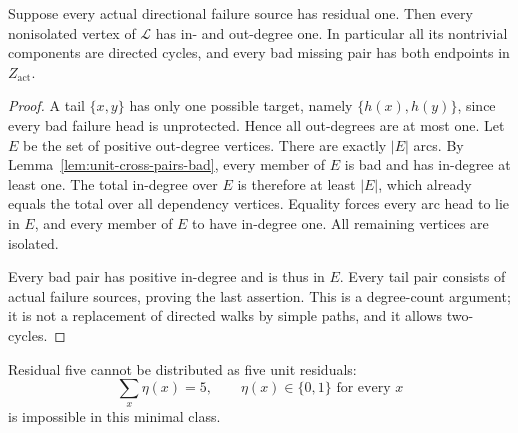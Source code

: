 \begin{lemma}
\label{lem:unit-dependency-cycles}
Suppose every actual directional failure source has residual one.
Then every nonisolated vertex of $\mathcal L$ has in- and out-degree one.
In particular all its nontrivial components are directed cycles,
and every bad missing pair has both endpoints in $Z_{\mathrm{act}}$.
\end{lemma}

\begin{proof}
A tail $\{x,y\}$ has only one possible target, namely
$\{h(x),h(y)\}$, since every bad failure head is unprotected. Hence
all out-degrees are at most one. Let $E$ be the set of positive
out-degree vertices. There are exactly $|E|$ arcs. By
Lemma~\ref{lem:unit-cross-pairs-bad}, every member of $E$ is bad
and has in-degree at least one. The total in-degree over $E$ is
therefore at least $|E|$, which already equals the total over all
dependency vertices. Equality forces every arc head to lie in $E$,
and every member of $E$ to have in-degree one. All remaining vertices
are isolated.

Every bad pair has positive in-degree and is thus in $E$. Every
tail pair consists of actual failure sources, proving the last
assertion. This is a degree-count argument; it is not a replacement
of directed walks by simple paths, and it allows two-cycles.
\end{proof}

\begin{theorem}
\label{thm:no-five-unit-residuals}
Residual five cannot be distributed as five unit residuals:
\[
 \sum_x\eta(x)=5,
 \qquad \eta(x)\in\{0,1\}\text{ for every }x
\]
is impossible in this minimal class.
\end{theorem}

